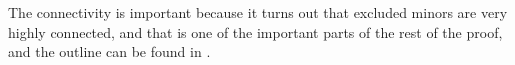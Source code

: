 The connectivity is important because it turns out that excluded minors are very highly connected, and that is one of the important parts of the rest of the proof, and the outline can be found in \cite{solving}.

% 
% 
% 
